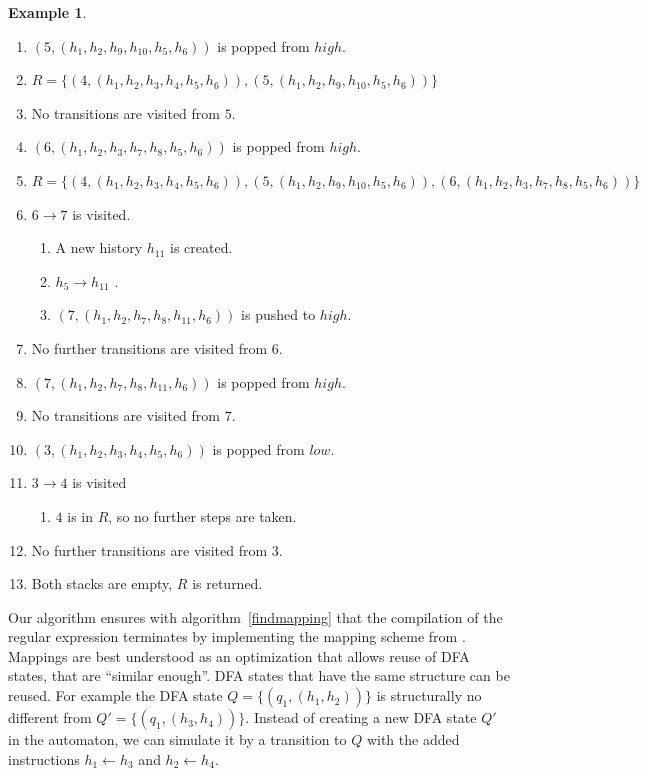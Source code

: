 \documentclass[english]{sigplanconf}
\theoremstyle{definition}
\newtheorem{example}{Example}[section]
\newcommand{\del}[1]{\textcolor{red}{\sout{#1}}} %
\newcommand{\del}[1]{} %
\renewcommand{\del}[1]{} %
\begin{document}
\begin{example}
\begin{enumerate}
\item $(5, (h_1, h_2, h_9, h_{10}, h_5, h_6))$ is popped from $high$.
\item $R=\{(4, (h_1, h_2, h_3, h_4, h_5, h_6)),\allowbreak (5, (h_1, h_2, h_9, h_{10}, h_5, h_6))\}$
\item No transitions are visited from $5$.
\item $(6, (h_1, h_2, h_3, h_7, h_8, h_5, h_6))$ is popped from $high$.
\item $R=\{(4, (h_1, h_2, h_3, h_4, h_5, h_6)),\allowbreak (5, (h_1, h_2, h_9, h_{10}, h_5, h_6)),\allowbreak (6, (h_1, h_2, h_3, h_7, h_8, h_5, h_6))\}$
\item $6\rightarrow 7$ is visited.\begin{enumerate}
	\item A new history $h_{11}$ is created.
	\item $h_5\rightarrow h_{11}$ \del{is executed}.
	\item $(7, (h_1, h_2, h_7, h_8, h_{11}, h_6))$ is pushed to $high$.
\end{enumerate}
\item No further transitions are visited from $6$.
\item $(7, (h_1, h_2, h_7, h_8, h_{11}, h_6))$ is popped from $high$.
\item No transitions are visited from $7$.
\item $(3, (h_1, h_2, h_3, h_4, h_5, h_6))$ is popped from $low$.
\item $3\rightarrow 4$ is visited \begin{enumerate}
	\item $4$ is in $R$, so no further steps are taken.
\end{enumerate}
\item No further transitions are visited from $3$.
\item Both stacks are empty, $R$ is returned.
\end{enumerate}
\label{ex:oneStep2}
\end{example}

Our algorithm ensures with algorithm~\ref{findmapping} that the 
compilation of the regular expression terminates by implementing 
the mapping scheme from \cite{Laur00a}. 
Mappings are best understood as an optimization that allows reuse
of DFA states, that are ``similar enough''. DFA states that have the 
same structure can be reused. For example the DFA state 
$Q=\{(q_1, (h_1, h_2))\}$ is structurally no different from 
$Q'=\{(q_1, (h_3, h_4))\}$. Instead of creating a new DFA state $Q'$ 
in the automaton, we can simulate it by a transition to $Q$ with the
added instructions $h_1\leftarrow h_3$ and $h_2 \leftarrow h_4$.
\end{document}
